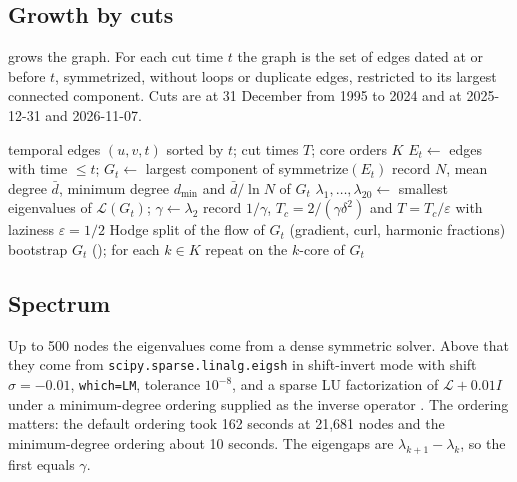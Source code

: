 \documentclass[11pt]{article}
\begin{document}
\subsection{Growth by cuts}
 grows the graph. For each cut time $t$ the graph is the set of edges dated at or
before $t$, symmetrized, without loops or duplicate edges, restricted to its largest connected
component. Cuts are at 31 December from 1995 to 2024 and at 2025-12-31 and 2026-11-07.

\begin{algorithm}
\caption{Growth by cuts and measurement.}\label{alg:cuts}
\begin{algorithmic}[1]
\Require temporal edges $(u,v,t)$ sorted by $t$; cut times $T$; core orders $K$
  \State $E_t \gets$ edges with time $\le t$; $G_t \gets$ largest component of symmetrize$(E_t)$
  \State record $N$, mean degree $\bar d$, minimum degree $d_{\min}$ and $\bar d/\ln N$ of $G_t$
  \State $\lambda_1,\dots,\lambda_{20} \gets$ smallest eigenvalues of $\mathcal L(G_t)$; $\gamma \gets \lambda_2$
  \State record $1/\gamma$, $T_c = 2/(\gamma\delta^2)$ and $T = T_c/\varepsilon$ with laziness $\varepsilon = 1/2$
  \State Hodge split of the flow of $G_t$ (gradient, curl, harmonic fractions)
  \State bootstrap $G_t$ (); for each $k \in K$ repeat on the $k$-core of $G_t$
\EndFor
\end{algorithmic}
\end{algorithm}

\subsection{Spectrum}
Up to 500 nodes the eigenvalues come from a dense symmetric solver. Above that they come from
\texttt{scipy.sparse.linalg.eigsh} in shift-invert mode with shift $\sigma = -0.01$, \texttt{which=LM},
tolerance $10^{-8}$, and a sparse LU factorization of $\mathcal L + 0.01 I$ under a minimum-degree
ordering supplied as the inverse operator \citep{lehoucq1998}. The ordering matters: the default
ordering took 162 seconds at 21,681 nodes and the minimum-degree ordering about 10 seconds. The
eigengaps are $\lambda_{k+1} - \lambda_k$, so the first equals $\gamma$.
\end{document}
